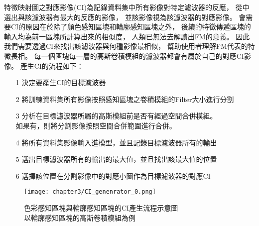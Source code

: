 \documentclass[class=NCU_thesis, crop=false]{standalone}
\begin{document}


	特徵映射圖之對應影像(CI)為記錄資料集中所有影像對特定濾波器的反應，
	從中選出與該濾波器有最大的反應的影像，
	並該影像視為該濾波器的對應影像。
	會需要CI的原因在於除了顏色感知區塊和輪廓感知區塊之外，
	後續的特徵傳遞區塊的輸入均為前一區塊所計算出來的相似度，
	人類已無法去解讀出FM的意義。
	因此我們需要透過CI來找出該濾波器與何種影像最相似，
	幫助使用者理解FM代表的特徵長相。
	每一個區塊每一層的高斯卷積模組的濾波器都會有屬於自己的對應CI影像。
	產生CI的流程如下：
	\begin{itemize}
		\item [1]
		決定要產生CI的目標濾波器
		\item [2]
		將訓練資料集所有影像按照感知區塊之卷積模組的Filter大小進行分割
		\item [3]
		分析在目標濾波器所屬的高斯模組前是否有經過空間合併模組。\\
		如果有，則將分割影像按照空間合併範圍進行合併。
		\item [4]
		將所有資料集影像輸入進模型，並且記錄目標濾波器所有的輸出
		\item [5]
		選出目標濾波器所有的輸出的最大值，並且找出該最大值的位置
		\item [6]
		選擇該位置在分割影像中的對應小圖作為目標濾波器的對應CI
	\end{itemize}


	\begin{figure}[H]
	\centering
	\label{fig:CI_generator_0}
	\captionsetup{justification=centering}
	\caption{色彩感知區塊與輪廓感知區塊的CI產生流程示意圖 \\ 以輪廓感知區塊的高斯卷積模組為例}
	\texttt{[image: chapter3/CI\_genenrator\_0.png]}
	\end{figure}
\end{document}

